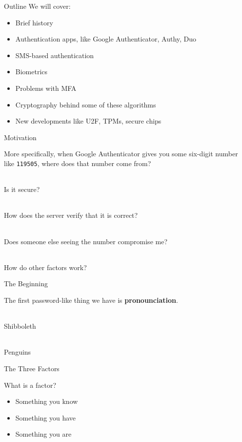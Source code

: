 \documentclass{beamer}
\begin{document}
\begin{frame}{Outline}
We will cover:

\begin{itemize}
  \item Brief history
  \item Authentication apps, like Google Authenticator, Authy, Duo
  \item SMS-based authentication
  \item Biometrics
  \item Problems with MFA
  \item Cryptography behind some of these algorithms
  \item New developments like U2F, TPMs, secure chips
\end{itemize}
\end{frame}

\begin{frame}{Motivation}

More specifically, when Google Authenticator gives you some six-digit number like \texttt{119505}, where does
that number come from?

\ \\

Is it secure?

\ \\

How does the server verify that it is correct?

\ \\

Does someone else seeing the number compromise me?

\ \\

How do other factors work?

\end{frame}

\begin{frame}{The Beginning}

The first password-like thing we have is \textbf{pronounciation}.

\ \\

Shibboleth

\ \\

Penguins

\end{frame}

\begin{frame}{The Three Factors}

What is a factor?

\begin{itemize}
  \item Something you know
  \item Something you have
  \item Something you are
\end{itemize}

\end{frame}
\end{document}
